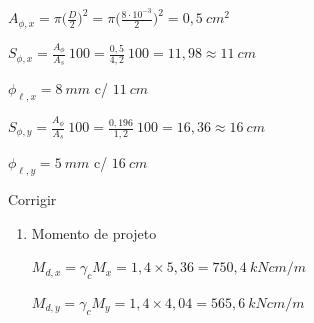\begin{resposta}
\begin{enumerate}[start=8]
\begin{enumerate}
            $A_{\phi,x} = \pi\Big(\frac{D}{2}\Big)^2 = \pi \Big(\frac{8\cdot 10^{-3}}{2}\Big)^2 = 0,5 \ cm^2$ 
            
            $S_{\phi,x} = \frac{A_{\phi}}{A_s}\ 100 = \frac{0,5}{4,2} \ 100 = 11,98 \approx 11 \ cm$

            $\phi_{\ell,x} = 8 \ mm$ c/ $11 \ cm$ \newline

            
            $S_{\phi,y} = \frac{A_{\phi}}{A_s}\ 100 = \frac{0,196}{1,2} \ 100 = 16,36 \approx 16 \ cm$ 

            $\phi_{\ell,y} = 5 \ mm$ c/ $16 \ cm$\newline
        \end{enumerate}


        \begin{observacao}
            Corrigir
        \end{observacao}


        \begin{enumerate}
            \item Momento de projeto
            
            
            $M_{d,x} = \gamma_c M_x = 1,4 \times 5,36 = 750,4 \ kN cm/m$
            
            $M_{d,y} = \gamma_c M_y = 1,4 \times 4,04 = 565,6 \ kN cm/m$ \newline

            
            

            
            

\end{enumerate}
\end{enumerate}
\end{resposta}
